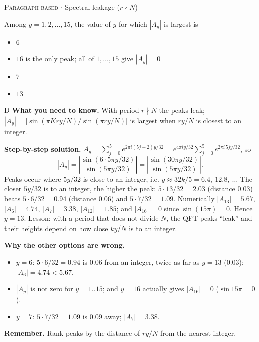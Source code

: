 \documentclass[11pt,a4paper]{article}
\newcommand{\optlabel}[1]{\textbf{(#1)}}
\newcommand{\correctlabel}[1]{\textcolor{okgreen}{\textbf{(#1)}\,\ding{51}}}
\newenvironment{qitem}[1]{\begin{list}{}{\setlength{\leftmargin}{3.3em}\setlength{\labelwidth}{3.1em}%
  \setlength{\labelsep}{0.2em}\setlength{\topsep}{3pt}\setlength{\parsep}{3pt}}\item[\textbf{Q.#1}\hfill]}{\end{list}}
\newcommand{\qsep}{\par\vspace{2pt}{\color{black!15}\hrule}\vspace{4pt}}
\newcommand{\qmeta}[2]{{\footnotesize\color{black!60}\textsc{#1} \;$\cdot$\; #2}\par}
\begin{document}
\begin{qitem}{20}
\qmeta{Paragraph based}{Spectral leakage ($r\nmid N$)}
Among $y = 1, 2, \dots, 15$, the value of $y$ for which $|A_y|$ is largest is
\begin{itemize}[leftmargin=2.6em, labelsep=0.4em, itemsep=2pt, topsep=3pt]
\item[\optlabel{A}] $6$
\item[\optlabel{B}] $16$ is the only peak; all of $1,\dots,15$ give $|A_y| = 0$
\item[\optlabel{C}] $7$
\item[\correctlabel{D}] $13$
\end{itemize}
\end{qitem}
\begin{solbox}{D}
\textbf{\color{brand}What you need to know.} With period $r \nmid N$ the peaks leak; $|A_y| = |\sin(\pi Kry/N)/\sin(\pi ry/N)|$ is largest when $ry/N$ is closest to an integer.

\textbf{\color{brand}Step-by-step solution.} $A_y = \sum_{j=0}^{5} e^{2\pi i (5j+2)y/32} = e^{4\pi i y/32}\sum_{j=0}^{5} e^{2\pi i\,5jy/32}$, so
\[ |A_y| = \left|\frac{\sin(6\cdot 5\pi y/32)}{\sin(5\pi y/32)}\right| = \left|\frac{\sin(30\pi y/32)}{\sin(5\pi y/32)}\right| . \]
Peaks occur where $5y/32$ is close to an integer, i.e. $y \approx 32k/5 = 6.4,\ 12.8,\ \dots$ The closer $5y/32$ is to an
integer, the higher the peak: $5\cdot13/32 = 2.03$ (distance $0.03$) beats $5\cdot6/32 = 0.94$ (distance $0.06$) and
$5\cdot7/32 = 1.09$. Numerically $|A_{13}| = 5.67$, $|A_6| = 4.74$, $|A_7| = 3.38$, $|A_{12}| = 1.85$; and $|A_{16}| = 0$ since
$\sin(15\pi) = 0$. Hence $y = 13$. Lesson: with a period that does not divide $N$, the QFT peaks ``leak'' and their
heights depend on how close $ky/N$ is to an integer.

\textbf{\color{brand}Why the other options are wrong.}
\begin{itemize}[leftmargin=2.4em, itemsep=1pt, topsep=2pt]
\item[\textbf{(A)}] $y = 6$: $5\cdot6/32 = 0.94$ is $0.06$ from an integer, twice as far as $y = 13$ ($0.03$); $|A_6| = 4.74 < 5.67$.
\item[\textbf{(B)}] $|A_y|$ is not zero for $y = 1..15$; and $y = 16$ actually gives $|A_{16}| = 0$ ($\sin 15\pi = 0$).
\item[\textbf{(C)}] $y = 7$: $5\cdot7/32 = 1.09$ is $0.09$ away; $|A_7| = 3.38$.
\end{itemize}
\textbf{\color{brand}Remember.} Rank peaks by the distance of $ry/N$ from the nearest integer.
\end{solbox}
\qsep
\end{document}
